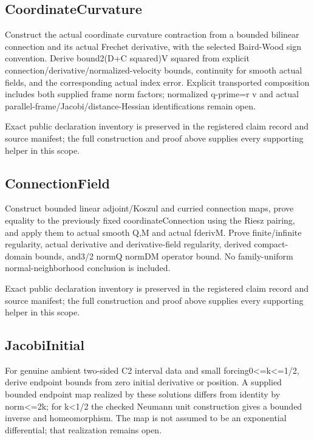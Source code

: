 \documentclass[11pt]{article}
\theoremstyle{definition}
\theoremstyle{remark}
\numberwithin{equation}{section}
\begin{document}
\subsection{CoordinateCurvature}
\label{daytime-v010:coordinatecurvature}
Construct the actual coordinate curvature contraction from a bounded bilinear connection and its actual Frechet derivative, with the selected Baird-Wood sign convention. Derive bound2(D+C squared)V squared from explicit connection/derivative/normalized-velocity bounds, continuity for smooth actual fields, and the corresponding actual index error. Explicit transported composition includes both supplied frame norm factors; normalized q-prime=r v and actual parallel-frame/Jacobi/distance-Hessian identifications remain open.

Exact public declaration inventory is preserved in the registered claim record and source manifest; the full construction and proof above supplies every supporting helper in this scope.

\subsection{ConnectionField}
\label{daytime-v010:connectionfield}
Construct bounded linear adjoint/Koszul and curried connection maps, prove equality to the previously fixed coordinateConnection using the Riesz pairing, and apply them to actual smooth Q,M and actual fderivM. Prove finite/infinite regularity, actual derivative and derivative-field regularity, derived compact-domain bounds, and3/2 normQ normDM operator bound. No family-uniform normal-neighborhood conclusion is included.

Exact public declaration inventory is preserved in the registered claim record and source manifest; the full construction and proof above supplies every supporting helper in this scope.

\subsection{JacobiInitial}
\label{daytime-v010:jacobiinitial}
For genuine ambient two-sided C2 interval data and small forcing0<=k<=1/2, derive endpoint bounds from zero initial derivative or position. A supplied bounded endpoint map realized by these solutions differs from identity by norm<=2k; for k<1/2 the checked Neumann unit construction gives a bounded inverse and homeomorphism. The map is not assumed to be an exponential differential; that realization remains open.
\end{document}
